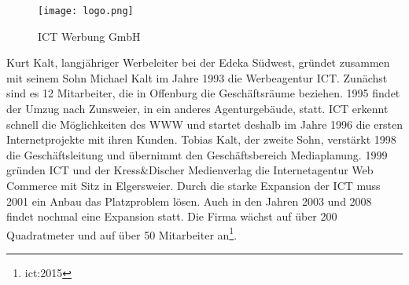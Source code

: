 \begin{wrapfigure}{r}{.4\textwidth}
\begin{centering}
\texttt{[image: logo.png]}
\end{centering}
\vspace{-15pt}
\caption{ICT Werbung GmbH\footnotemark}
\end{wrapfigure}

Kurt Kalt, langjähriger Werbeleiter bei der Edeka Südwest, gründet zusammen mit seinem Sohn Michael Kalt im Jahre 1993 die Werbeagentur ICT. Zunächst sind es 12 Mitarbeiter, die in Offenburg die Geschäftsräume beziehen. 1995 findet der Umzug nach Zunsweier, in ein anderes Agenturgebäude, statt. ICT erkennt schnell die Möglichkeiten des {WWW} und startet deshalb im Jahre 1996 die ersten Internetprojekte mit ihren Kunden. Tobias Kalt, der zweite Sohn, verstärkt 1998 die Geschäftsleitung und übernimmt den Geschäftsbereich Mediaplanung. 1999 gründen ICT und der Kress\&Discher Medienverlag die Internetagentur Web Commerce mit Sitz in Elgersweier. Durch die starke Expansion der ICT muss 2001 ein Anbau das Platzproblem lösen. Auch in den Jahren 2003 und 2008 findet nochmal eine Expansion statt. Die Firma wächst auf über 200 Quadratmeter und auf über 50 Mitarbeiter an\footnote{ict:2015}. 

